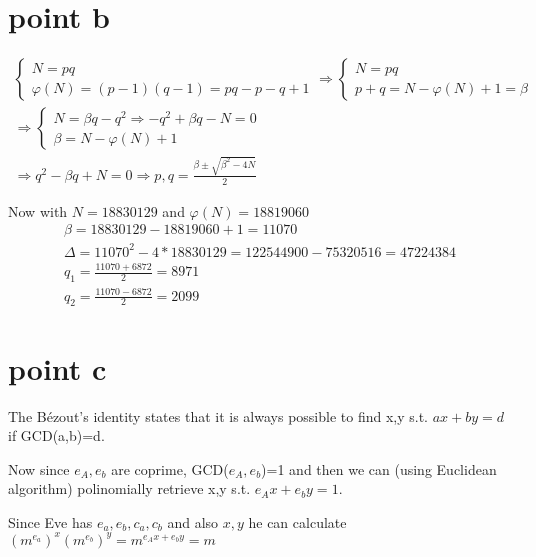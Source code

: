 \newpage
\section{point b}

\begin{gather*}
    \begin{cases}
        N=pq \\
        \varphi(N)=(p-1)(q-1)=pq-p-q+1
        \end{cases}
        \Rightarrow
    \begin{cases}
            N=pq\\
            p+q=N-\varphi(N)+1=\beta 
    \end{cases}\\
    \Rightarrow
    \begin{cases}
            N=\beta q -q^2 \Rightarrow -q^2+\beta q-N=0\\
            \beta=N-\varphi(N)+1
    \end{cases}\\
    \Rightarrow q^2-\beta q+N=0 \Rightarrow p,q=\frac{\beta \pm \sqrt{\beta^2-4N}}{2}
\end{gather*}

Now with $N= 18830129$ and $\varphi(N) = 18819060$\\

\begin{gather*}
    \beta=18830129 - 18819060 +1 = 11070\\
    \Delta=11070^2-4*18830129=122544900-75320516=47224384\\
    q_1=\frac{11070+6872}{2}=8971\\
    q_2=\frac{11070-6872}{2}=2099
\end{gather*}

\section{point c}

The Bézout’s identity states that it is always possible to find x,y s.t. 
$ax+by=d$ if GCD(a,b)=d.

Now since $e_A,e_b$ are coprime, GCD($e_A,e_b$)=1 and then we can (using Euclidean algorithm) polinomially retrieve x,y s.t. $e_A x + e_b y =1$.

Since Eve has $e_a,e_b,c_a,c_b$ and also $x,y$ he can calculate $(m^{e_a})^x (m^{e_b})^y=m^{e_A x + e_b y}=m$

